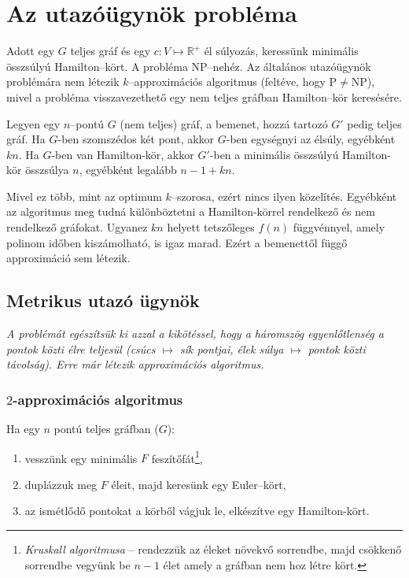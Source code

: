 \newpage
\section{Az utazóügynök probléma}

Adott egy $G$ teljes gráf és egy $c:V \mapsto \mathbb{R}^+$ él súlyozás,
keressünk minimális összsúlyú Hamilton--kört. A probléma NP--nehéz. Az általános
utazóügynök problémára nem létezik $k$--approximációs algoritmus (feltéve, hogy
P$\ne$NP), mivel a probléma visszavezethető egy nem teljes gráfban Hamilton--kör
keresésére.

Legyen egy $n$--pontú $G$ (nem teljes) gráf, a bemenet, hozzá tartozó $G'$ pedig
teljes gráf. Ha $G$-ben szomszédos két pont, akkor $G$-ben egységnyi az élsúly,
egyébként $kn$. Ha $G$-ben van Hamilton-kör, akkor $G'$-ben a minimális
összsúlyú Hamilton-kör összsúlya $n$, egyébként legalább $n-1+kn$. 

Mivel ez több, mint az optimum $k$--szorosa, ezért nincs ilyen közelítés.
Egyébként az algoritmus meg tudná különböztetni a Hamilton-körrel rendelkező és
nem rendelkező gráfokat. Ugyanez $kn$ helyett tetszőleges $f(n)$ függvénnyel,
amely polinom időben kiszámolható, is igaz marad. Ezért a bemenettől függő
approximáció sem létezik.

\subsection{Metrikus utazó ügynök}

\emph{A problémát egészítsük ki azzal a kikötéssel, hogy a háromszög
egyenlőtlenség a pontok közti élre teljesül (csúcs $\mapsto$ sík pontjai, élek
súlya $\mapsto$ pontok közti távolság). Erre már létezik approximációs
algoritmus.}

\subsubsection{$2$-approximációs algoritmus}

Ha egy $n$ pontú teljes gráfban ($G$):
\begin{enumerate}
  \item vesszünk egy minimális $F$ feszítőfát\footnote{\emph{Kruskall algoritmusa} -- 
rendezzük az éleket növekvő sorrendbe, majd csökkenő sorrendbe vegyünk be $n-1$ élet
amely a gráfban nem hoz létre kört.},
  \item duplázzuk meg $F$ éleit, majd keresünk egy Euler--kört,
  \item az ismétlődő pontokat a körből vágjuk le, elkészítve egy Hamilton-kört.
\end{enumerate}

